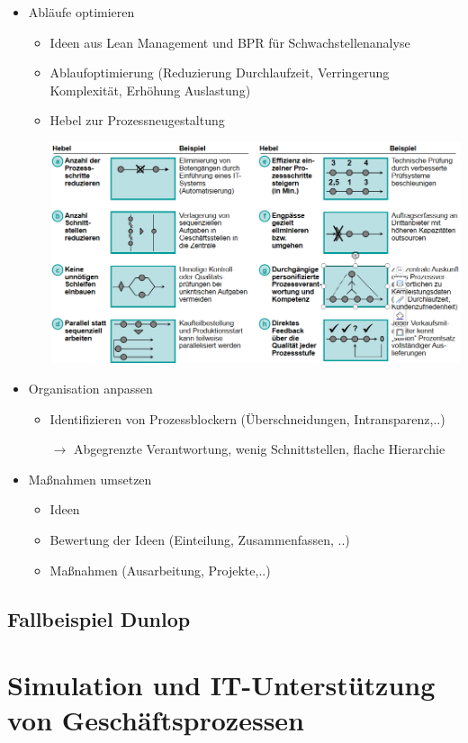 \documentclass[11pt,a4paper]{article}
\begin{document}
\begin{itemize}
\item Abläufe optimieren
	\begin{itemize}
	\item Ideen aus Lean Management und BPR für Schwachstellenanalyse
	\item Ablaufoptimierung (Reduzierung Durchlaufzeit, Verringerung Komplexität, Erhöhung Auslastung)
	\item Hebel zur Prozessneugestaltung
	\item[] \includegraphics[width=15cm]{Bilder/hebel}
	\end{itemize}

\item Organisation anpassen
	\begin{itemize}
	\item Identifizieren von Prozessblockern (Überschneidungen, Intransparenz,..)
	\item[$\rightarrow$] Abgegrenzte Verantwortung, wenig Schnittstellen, flache Hierarchie
	\end{itemize}
	
\item Maßnahmen umsetzen
	\begin{itemize}
	\item Ideen 
	\item Bewertung der Ideen (Einteilung, Zusammenfassen, ..)
	\item Maßnahmen (Ausarbeitung, Projekte,..)
	\end{itemize}
\end{itemize}

\subsection{Fallbeispiel Dunlop}

\section{Simulation und IT-Unterstützung von Geschäftsprozessen}
\end{document}

